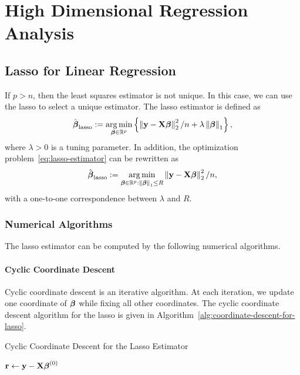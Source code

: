 \chapter{High Dimensional Regression Analysis}

\section{Lasso for Linear Regression}

If \(p>n\), then the least squares estimator is not unique. In this case, we can use the lasso to select a unique estimator. The lasso estimator is defined as
\begin{equation}
	\label{eq:lasso-estimator}
	\hat{\boldsymbol{\beta}}_{\text{lasso}}:=\underset{\boldsymbol{\beta}\in\mathbb{R}^{p}}{\arg\min}\left\{\left\|\mathbf{y}-\mathbf{X}\boldsymbol{\beta}\right\|_{2}^{2}/n+\lambda\left\|\boldsymbol{\beta}\right\|_{1}\right\},
\end{equation}
where \(\lambda>0\) is a tuning parameter. In addition, the optimization problem~\eqref{eq:lasso-estimator} can be rewritten as
\begin{equation*}
	\hat{\boldsymbol{\beta}}_{\text{lasso}}:=\underset{\boldsymbol{\beta}\in\mathbb{R}^{p}:\left\|\boldsymbol{\beta}\right\|_{1}\leq R}{\arg\min}\left\|\mathbf{y}-\mathbf{X}\boldsymbol{\beta}\right\|_{2}^{2}/n,
\end{equation*}
with a one-to-one correspondence between \(\lambda\) and \(R\).

\subsection{Numerical Algorithms}

The lasso estimator can be computed by the following numerical algorithms.

\subsubsection{Cyclic Coordinate Descent}

Cyclic coordinate descent is an iterative algorithm. At each iteration, we update one coordinate of \(\boldsymbol{\beta}\) while fixing all other coordinates.
The cyclic coordinate descent algorithm for the lasso is given in Algorithm~\ref{alg:coordinate-descent-for-lasso}.

\begin{algorithm}[H]
	\caption{Cyclic Coordinate Descent for the Lasso Estimator}\label{alg:coordinate-descent-for-lasso}
	\(\mathbf{r} \leftarrow \mathbf{y}-\mathbf{X}\boldsymbol{\beta}^{(0)}\)\;
\end{algorithm}

